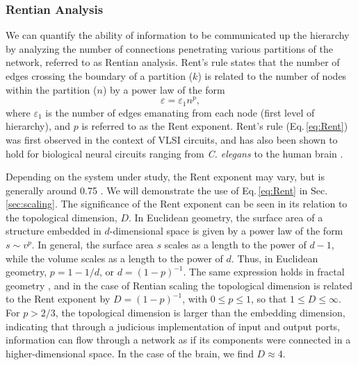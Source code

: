 \subsubsection{Rentian Analysis}
We can quantify the ability of information to be communicated up the hierarchy by analyzing the number of connections penetrating various partitions of the network, referred to as Rentian analysis. Rent's rule states that the number of edges crossing the boundary of a partition ($k$) is related to the number of nodes within the partition ($n$) by a power law of the form
\begin{equation}
\label{eq:Rent}
\varepsilon = \varepsilon_1 n^p,
\end{equation}
where $\varepsilon_1$ is the number of edges emanating from each node (first level of hierarchy), and $p$ is referred to as the Rent exponent. Rent's rule (Eq.\,\ref{eq:Rent}) was first observed in the context of VLSI circuits, and has also been shown to hold for biological neural circuits ranging from \textit{C. elegans} to the human brain \cite{bagr2010}. 

Depending on the system under study, the Rent exponent may vary, but is generally around 0.75 \cite{bagr2010}. We will demonstrate the use of Eq.\,\ref{eq:Rent} in Sec.\,\ref{sec:scaling}. The significance of the Rent exponent can be seen in its relation to the topological dimension, $D$. In Euclidean geometry, the surface area of a structure embedded in $d$-dimensional space is given by a power law of the form $s\sim v^p$. In general, the surface area $s$ scales as a length to the power of $d-1$, while the volume scales as a length to the power of $d$. Thus, in Euclidean geometry, $p = 1-1/d$, or $d = (1-p)^{-1}$. The same expression holds in fractal geometry \cite{ma1983,sc1991}, and in the case of Rentian scaling the topological dimension is related to the Rent exponent by $D = (1-p)^{-1}$, with $0 \le p \le 1$, so that $1 \le D \le \infty$. For $p > 2/3$, the topological dimension is larger than the embedding dimension, indicating that through a judicious implementation of input and output ports, information can flow through a network as if its components were connected in a higher-dimensional space. In the case of the brain, we find $D \approx 4$.

